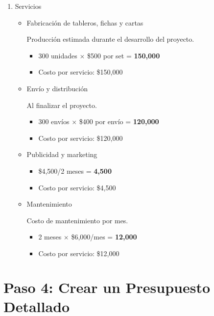 \documentclass[12pt]{article}
\begin{document}
\begin{enumerate}
\begin{itemize}
	\end{itemize}

	

	\item Servicios

	\begin{itemize}

		\item Fabricación de tableros, fichas y cartas

		Producción estimada durante el desarrollo del proyecto.
		\begin{itemize}
            \item 300 unidades $\times$ \$500 por set = \textbf{150,000}
			\item Costo por servicio: \$150,000
        \end{itemize}

		\item Envío y distribución
		
		Al finalizar el proyecto.
		\begin{itemize}
            \item 300 envíos $\times$ \$400 por envío = \textbf{120,000}
            \item Costo por servicio: \$120,000
        \end{itemize}

		\item Publicidad y marketing

		\begin{itemize}
			\item \$4,500/2 meses = \textbf{4,500}
            \item Costo por servicio: \$4,500
        \end{itemize}

		\item Mantenimiento

		Costo de mantenimiento por mes.
		\begin{itemize}
            \item 2 meses $\times$ \$6,000/mes = \textbf{12,000}
            \item Costo por servicio: \$12,000
        \end{itemize}

	\end{itemize}

\end{enumerate}
    


 \section*{Paso 4: Crear un Presupuesto Detallado}
    
\end{document}
